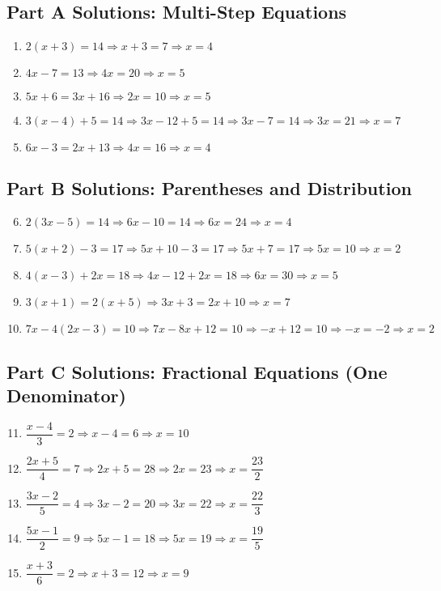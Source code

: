 \documentclass[14pt]{extarticle}
\begin{document}
\subsection*{Part A Solutions: Multi-Step Equations}
\begin{enumerate}
    \item \(2(x + 3) = 14 \Rightarrow x + 3 = 7 \Rightarrow x = \boxed{4}\)
    \item \(4x - 7 = 13 \Rightarrow 4x = 20 \Rightarrow x = \boxed{5}\)
    \item \(5x + 6 = 3x + 16 \Rightarrow 2x = 10 \Rightarrow x = \boxed{5}\)
    \item \(3(x - 4) + 5 = 14 \Rightarrow 3x - 12 + 5 = 14 \Rightarrow 3x - 7 = 14 \Rightarrow 3x = 21 \Rightarrow x = \boxed{7}\)
    \item \(6x - 3 = 2x + 13 \Rightarrow 4x = 16 \Rightarrow x = \boxed{4}\)
\end{enumerate}

\subsection*{Part B Solutions: Parentheses and Distribution}
\begin{enumerate}
    \setcounter{enumi}{5}
    \item \(2(3x - 5) = 14 \Rightarrow 6x - 10 = 14 \Rightarrow 6x = 24 \Rightarrow x = \boxed{4}\)
    \item \(5(x + 2) - 3 = 17 \Rightarrow 5x + 10 - 3 = 17 \Rightarrow 5x + 7 = 17 \Rightarrow 5x = 10 \Rightarrow x = \boxed{2}\)
    \item \(4(x - 3) + 2x = 18 \Rightarrow 4x - 12 + 2x = 18 \Rightarrow 6x = 30 \Rightarrow x = \boxed{5}\)
    \item \(3(x + 1) = 2(x + 5) \Rightarrow 3x + 3 = 2x + 10 \Rightarrow x = \boxed{7}\)
    \item \(7x - 4(2x - 3) = 10 \Rightarrow 7x - 8x + 12 = 10 \Rightarrow -x + 12 = 10 \Rightarrow -x = -2 \Rightarrow x = \boxed{2}\)
\end{enumerate}

\subsection*{Part C Solutions: Fractional Equations (One Denominator)}
\begin{enumerate}
    \setcounter{enumi}{10}
    \item \(\dfrac{x - 4}{3} = 2 \Rightarrow x - 4 = 6 \Rightarrow x = \boxed{10}\)
    \item \(\dfrac{2x + 5}{4} = 7 \Rightarrow 2x + 5 = 28 \Rightarrow 2x = 23 \Rightarrow x = \boxed{\dfrac{23}{2}}\)
    \item \(\dfrac{3x - 2}{5} = 4 \Rightarrow 3x - 2 = 20 \Rightarrow 3x = 22 \Rightarrow x = \boxed{\dfrac{22}{3}}\)
    \item \(\dfrac{5x - 1}{2} = 9 \Rightarrow 5x - 1 = 18 \Rightarrow 5x = 19 \Rightarrow x = \boxed{\dfrac{19}{5}}\)
    \item \(\dfrac{x + 3}{6} = 2 \Rightarrow x + 3 = 12 \Rightarrow x = \boxed{9}\)
\end{enumerate}
\end{document}
